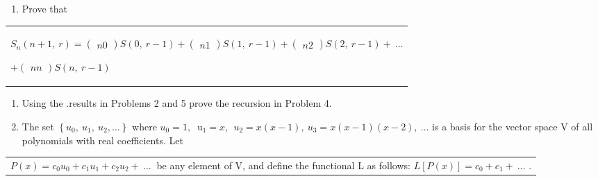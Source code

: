 \documentclass[10pt,letter]{article}
\renewenvironment{quote}
  {\begin{tabular}{|p{13cm}}}
  {\end{tabular}}
\begin{document}
\begin{enumerate}
\def\labelenumi{\arabic{enumi}.}

\item
  Prove that

\end{enumerate}

\begin{quote}
\(S_{n}\left( n + 1,\ r \right) =

\begin{pmatrix}
n 
0 
\end{pmatrix}
S\left( 0,\ r - 1 \right) +

\begin{pmatrix}
n 
1 
\end{pmatrix}
S\left( 1,\ r - 1 \right) +

\begin{pmatrix}
n 
2 
\end{pmatrix}
S\left( 2,\ r - 1 \right) + \ \ldots\)

\(+

\begin{pmatrix}
n 
n 
\end{pmatrix}
S(n,\ r - 1)\)

\end{quote}

\begin{enumerate}
\def\labelenumi{\arabic{enumi}.}

\item
  Using the .results in Problems 2 and 5 prove the recursion in Problem
  4.
\item
  The set \(\left\{ u_{0},\ u_{1},\ u_{2},\ldots \right\}\) where
  \(u_{0} = 1,\ \text{\ u}_{1} = x,\ \ u_{2} = x\left( x - 1 \right),\ u_{3} = x\left( x - 1 \right)\left( x - 2 \right),\ \ldots\)
  is a basis for the vector space V of all polynomials with real
  coefficients. Let

\end{enumerate}

\begin{quote}
\(P\left( x \right) = c_{0}u_{0} + c_{1}u_{1} + c_{2}u_{2} + \ \ldots\ \)
be any element of V, and define the functional L as follows:
\(L\left\lbrack P\left( x \right) \right\rbrack = c_{0} + c_{1} + \ \ldots\)
.

\end{quote}
\end{document}
